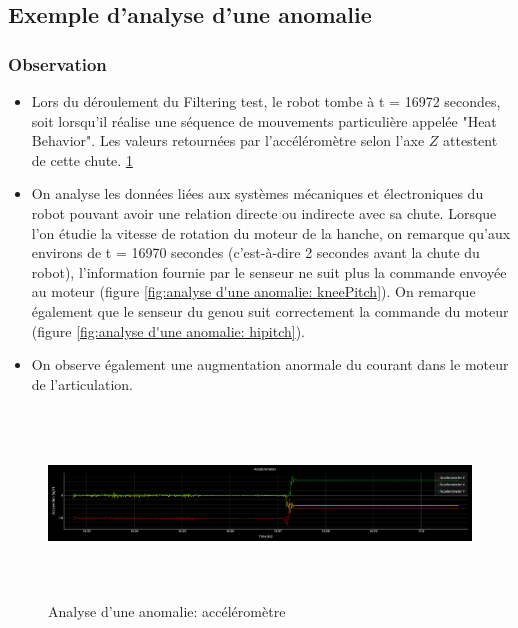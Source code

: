 \subsection{Exemple d'analyse d'une anomalie}
\label{Introduction:Expression du besoin:Exemple d'analyse d'une anomalie}

\subsubsection{Observation}
\begin{itemize}
	\item Lors du déroulement du Filtering test, le robot tombe à t = 16972 secondes, soit lorsqu'il réalise une séquence de mouvements particulière appelée "Heat Behavior". Les valeurs retournées par l'accéléromètre selon l'axe $Z$ attestent de cette chute.	\ref{fig:analyse d'une anomalie: accéléromètre}
	\item On analyse les données liées aux systèmes mécaniques et électroniques du robot pouvant avoir une relation directe ou indirecte avec sa chute.  Lorsque l'on étudie la vitesse de rotation du moteur de la hanche, on remarque qu'aux environs de  t = 16970 secondes (c'est-à-dire 2 secondes avant la chute du robot), l'information fournie par le senseur ne suit plus la commande  envoyée au moteur (figure \ref{fig:analyse d'une anomalie: kneePitch}). On remarque également que le senseur du genou suit correctement la commande du moteur (figure \ref{fig:analyse d'une anomalie: hipitch}).
	\item On observe également une augmentation anormale du courant dans le moteur de l'articulation. 
\end{itemize} 

\begin{figure}[h]
	\centering\includegraphics[height=5cm,width=15cm]{images/analyse_1.png}
	\caption{Analyse d'une anomalie: accéléromètre}
	\label{fig:analyse d'une anomalie: accéléromètre}
\end{figure}

